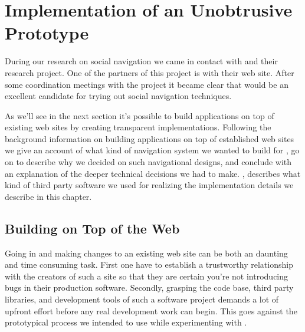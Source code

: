 \chapter{Implementation of an Unobtrusive Prototype}
\label{chapter:implementation}

During our research on social navigation we came in contact with
%
and their  research project.%
One of the partners of this project is %
with their \urort{} web site. After some coordination meetings with the
 project it became clear that \urort{} would be an excellent
candidate for trying out social navigation techniques.

As we'll see in the next section it's possible to build applications on top
of existing web sites by creating transparent implementations.
Following the background information on building applications
on top of established web sites we give an account of
what kind of navigation system we wanted to build for \urort{}, go on to
describe why we decided on such navigational designs, and conclude with an
explanation of the deeper technical decisions we had to make.
,
describes what kind of third party software we used for realizing the
implementation details we describe in this chapter.

\section{Building on Top of the Web}
\label{section:implementation.building.on.top.of.the.web}

Going in and making changes to an existing web site can be both an
daunting and time consuming task. First one have to establish a trustworthy
relationship with the creators of such a site so that they are certain
you're not introducing bugs in their production software. Secondly, grasping
the code base, third party libraries, and development tools of such a software
project demands a lot of upfront effort before any real development work can
begin. This goes against the prototypical process we intended to use while
experimenting with \urort{}.

